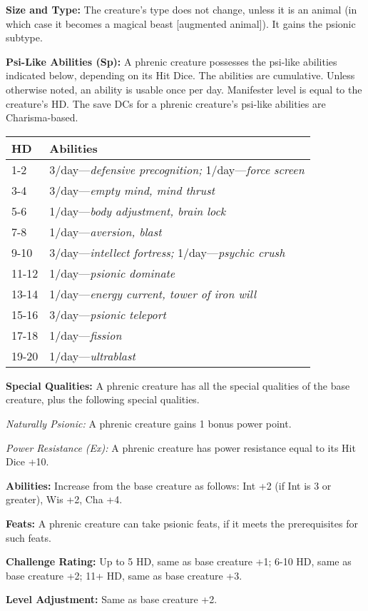 \documentclass{article}
\begin{document}
\textbf{Size and Type: }The creature's type does not change, unless it is an animal 
(in which case it becomes a magical beast [augmented animal]). It gains the psionic 
subtype.

\textbf{Psi-Like Abilities (Sp): }A phrenic creature possesses the psi-like abilities 
indicated below, depending on its Hit Dice. The abilities are cumulative. Unless 
otherwise noted, an ability is usable once per day. Manifester level is equal to 
the creature's HD. The save DCs for a phrenic creature's psi-like abilities are 
Charisma-based.

\begin{tabular}{|>{\raggedright}p{23pt}|>{\raggedright}p{209pt}|}
\hline
H\textbf{D} & A\textbf{bilities}\tabularnewline
\hline
1-2 & 3/day---\textit{defensive precognition; }1/day---\textit{force screen}\tabularnewline
\hline
3-4 & 3/day---\textit{empty mind, mind thrust}\tabularnewline
\hline
5-6 & 1/day---\textit{body adjustment, brain lock}\tabularnewline
\hline
7-8 & 1/day---\textit{aversion, blast}\tabularnewline
\hline
9-10 & 3/day---\textit{intellect fortress; }1/day---\textit{psychic crush}\tabularnewline
\hline
11-12 & 1/day---\textit{psionic dominate}\tabularnewline
\hline
13-14 & 1/day---\textit{energy current, tower of iron will}\tabularnewline
\hline
15-16 & 3/day---\textit{psionic teleport}\tabularnewline
\hline
17-18 & 1/day---\textit{fission}\tabularnewline
\hline
19-20 & 1/day---\textit{ultrablast}\tabularnewline
\hline
\end{tabular}

\textbf{Special Qualities:} A phrenic creature has all the special qualities of 
the base creature, plus the following special qualities.

\textit{Naturally Psionic: }A phrenic creature gains 1 bonus power point.

\textit{Power Resistance (Ex): }A phrenic creature has power resistance equal to 
its Hit Dice +10. 

\textbf{Abilities:} Increase from the base creature as follows: Int +2 (if Int 
is 3 or greater), Wis +2, Cha +4.

\textbf{Feats:} A phrenic creature can take psionic feats, if it meets the prerequisites 
for such feats.

\textbf{Challenge Rating: }Up to 5 HD, same as base creature +1; 6-10 HD, same 
as base creature +2; 11+ HD, same as base creature +3.

\textbf{Level Adjustment:} Same as base creature +2.
\end{document}
